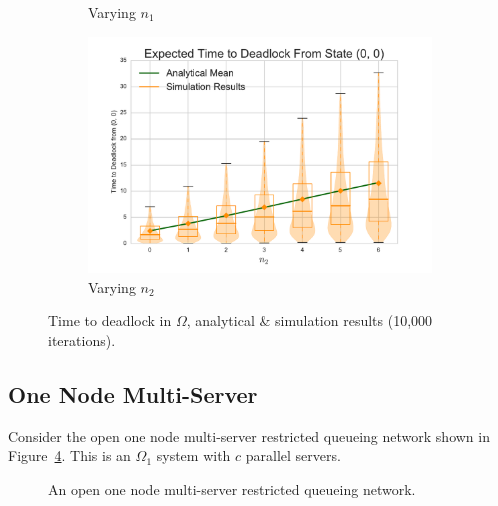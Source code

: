 \documentclass{article}
\numberwithin{equation}{section}
\begin{document}
\begin{figure}[!htbp]
\begin{center}
\begin{subfigure}[b]{0.35\textwidth}
  \caption{Varying $n_1$}
  \label{fig:timestodeadlockfb_n1}
\end{subfigure}
\begin{subfigure}[b]{0.35\textwidth}
  \includegraphics[width=\textwidth]{images/vary_n2fb}
  \caption{Varying $n_2$}
  \label{fig:timestodeadlockfb_n2}
\end{subfigure}
\end{center}
\caption{Time to deadlock in $\Omega$, analytical \& simulation results (10,000 iterations).}
\label{fig:timestodeadlockfeedback}
\end{figure}











\subsection{One Node Multi-Server}\label{sec:1nodeMS}

Consider the open one node multi-server restricted queueing network shown in Figure~\ref{fig:queueingnetwork_1nodemulti}.
This is an $\Omega_1$ system with $c$ parallel servers.

\begin{figure}[!htbp]
  \begin{center}
  
  \end{center}
  \caption{An open one node multi-server restricted queueing network.}
  \label{fig:queueingnetwork_1nodemulti}
\end{figure}
\end{document}
